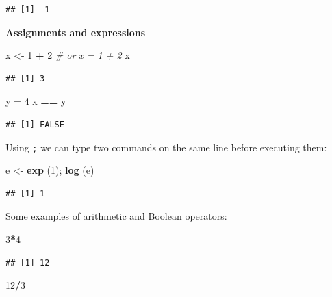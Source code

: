 \documentclass[]{book}
\newenvironment{Shaded}{\begin{snugshade}}{\end{snugshade}}
\newcommand{\CommentTok}[1]{\textcolor[rgb]{0.56,0.35,0.01}{\textit{#1}}}
\newcommand{\DecValTok}[1]{\textcolor[rgb]{0.00,0.00,0.81}{#1}}
\newcommand{\KeywordTok}[1]{\textcolor[rgb]{0.13,0.29,0.53}{\textbf{#1}}}
\newcommand{\NormalTok}[1]{#1}
\newcommand{\OperatorTok}[1]{\textcolor[rgb]{0.81,0.36,0.00}{\textbf{#1}}}
\newcommand{\StringTok}[1]{\textcolor[rgb]{0.31,0.60,0.02}{#1}}
\begin{document}
\begin{verbatim}
## [1] -1
\end{verbatim}

\textbf{Assignments and expressions}

\begin{Shaded}
\begin{Highlighting}[]
\NormalTok{x <-}\StringTok{ }\DecValTok{1} \OperatorTok{+}\StringTok{ }\DecValTok{2} \CommentTok{# or x = 1 + 2}
\NormalTok{x}
\end{Highlighting}
\end{Shaded}

\begin{verbatim}
## [1] 3
\end{verbatim}

\begin{Shaded}
\begin{Highlighting}[]
\NormalTok{y =}\StringTok{ }\DecValTok{4}
\NormalTok{x }\OperatorTok{==}\StringTok{ }\NormalTok{y}
\end{Highlighting}
\end{Shaded}

\begin{verbatim}
## [1] FALSE
\end{verbatim}

Using \texttt{;} we can type two commands on the same line before executing them:

\begin{Shaded}
\begin{Highlighting}[]
\NormalTok{e <-}\StringTok{ }\KeywordTok{exp}\NormalTok{ (}\DecValTok{1}\NormalTok{); }\KeywordTok{log}\NormalTok{ (e)}
\end{Highlighting}
\end{Shaded}

\begin{verbatim}
## [1] 1
\end{verbatim}

Some examples of arithmetic and Boolean operators:

\begin{Shaded}
\begin{Highlighting}[]
\DecValTok{3}\OperatorTok{*}\DecValTok{4}
\end{Highlighting}
\end{Shaded}

\begin{verbatim}
## [1] 12
\end{verbatim}

\begin{Shaded}
\begin{Highlighting}[]
\DecValTok{12}\OperatorTok{/}\DecValTok{3}
\end{Highlighting}
\end{Shaded}
\end{document}
